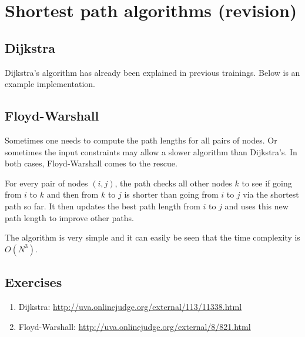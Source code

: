 \section{Shortest path algorithms (revision)}
\subsection{Dijkstra}
Dijkstra's algorithm has already been explained in previous trainings. Below is an example implementation.


\subsection{Floyd-Warshall}
Sometimes one needs to compute the path lengths for all pairs of nodes. Or sometimes the input constraints may allow a slower algorithm than Dijkstra's. In both cases, Floyd-Warshall comes to the rescue.

For every pair of nodes $(i, j)$, the path checks all other nodes $k$ to see if going from $i$ to $k$ and then from $k$ to $j$ is shorter than going from $i$ to $j$ via the shortest path so far. It then updates the best path length from $i$ to $j$ and uses this new path length to improve other paths.

The algorithm is very simple and it can easily be seen that the time complexity is $O(N^3)$.


\subsection{Exercises}
\begin{enumerate}
\item Dijkstra: \url{http://uva.onlinejudge.org/external/113/11338.html}
\item Floyd-Warshall: \url{http://uva.onlinejudge.org/external/8/821.html}

\end{enumerate}